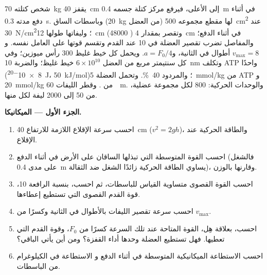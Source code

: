 \begin{problem}
\label{pb:b2:muscle-movement:1}
شخص كتلته \qty{70}{kg} يقفز \qty{40}{cm} إلى الأعلى، فيرفع
مركز كتلة جسمه \qty{0.4}{m} في أثناء دفع مدته \qty{0.3}{s}.
وباسطات الساق (\qty{20}{kg} من العضل) لها مقطع
مجموعه \qty{500}{cm^2} عند \qty{30}{N/cm^2}؛ وليفاتها
طولها \qty{12}{cm} (\num{48000} ) وتقصر بمقدار
\qty{4}{cm} في أثناء الدفع؛ والمفاصل تضرب تقصير العضلة
في \num{10} عند القدم وتقسم قوتها على العامل
نفسه. و$v_{\max} = 8$ أطوال في الثانية، و$a = F_0/4$. ويحمل كل
خيط غليظ \num{300} رأس ميوزين؛ وفي كل سنتيمتر مربع من العضل $6\times
10^{10}$ خيط غليظ؛ والضربة \qty{10}{nm} وتكلف ATP واحدًا (\qty{8e-20}{J}، \qty{50}{kJ/mol})؛
والمردود \qty{40}{\%}. وتحمل العضلة \qty{5}{mmol/kg} من ATP و
\qty{20}{mmol/kg} من . وقطر الليفات \qty{60}{\micro
m}. والوحدات الحركية: \num{800} لكل مجموعة عضلية، من \num{50} إلى
\num{2000} ليفة لكل منها.

\medskip
\noindent\textbf{الجزء الأول --- الميكانيكا.}
\begin{enumerate}
  \item احسب سرعة الإقلاع اللازمة للارتفاع \qty{40}{cm}
        ($v^{2} = 2gh$)، والطاقة الحركية عند الإقلاع.
  \item احسب القوة المتوسطة التي تبذلها الساقان على الأرض في أثناء
        الدفع (فالشغل على مدى \qty{0.4}{m} يساوي الطاقة الحركية
        زائدًا الشغل ضد الثقالة)، وقارنها بالوزن.
  \item احسب القوة القصوى متساوية القياس للباسطات، ثم احسب،
        بنسبة الرافعة 10، قوة القدم القصوى التي تستطيع
        إعطاءها.
  \item احسب سرعة تقصير الليفات بالأطوال في الثانية
        وكسرًا من $v_{\max}$.
  \item احسب، بعلاقة هِل، القوة المتاحة عند تلك
        السرعة كسرًا من $F_0$، وقوة القدم التي تعطيها.
        فهل تستطيع العضلة وحدها أداء القفزة؟ ومن أين يأتي
        الباقي؟
  \item احسب الاستطاعة الميكانيكية المتوسطة في أثناء الدفع و
        الاستطاعة في الكيلوغرام من الباسطات.
\end{enumerate}


\end{problem}
